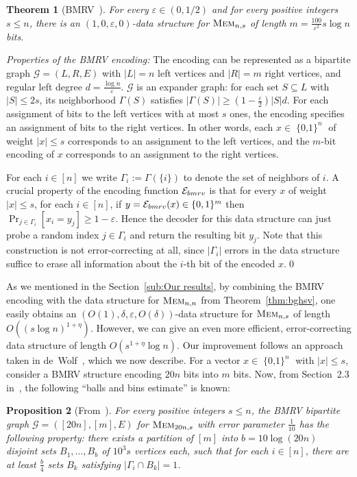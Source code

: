 \documentclass[11pt,english]{article}
\newtheorem{theorem}{Theorem}
\newtheorem{prop}[theorem]{Proposition}
\theoremstyle{definition}
\theoremstyle{remark}
\newcommand{\eps}{\varepsilon}
\newcommand{\E}{{\cal E}}
\newcommand{\cube}{\operatorname{\{0, 1\}}}
\newcommand{\mem}{\mbox{\textsc{Mem}}}
\begin{document}
\begin{theorem}[BMRV~\cite{bmrv:bitvectorsj}]\label{thm:bmrv}
For every $\eps\in(0,1/2)$ and for every positive integers $s\leq n$,
there is an $(1,0,\eps,0)$-data structure for $\mem_{n,s}$ of length
$m=\frac{100}{\eps^{2}}s\log n$ bits. \end{theorem}

\emph{Properties of the BMRV encoding:} The encoding can be represented
as a bipartite graph $\mathcal{G}=(L,R,E)$ with $|L|=n$ left vertices
and $|R|=m$ right vertices, and regular left degree $d=\frac{\log n}{\eps}$.
$\mathcal{G}$ is an expander graph: for each set $S\subseteq L$ with
$|S|\leq2s$, its neighborhood $\Gamma(S)$ satisfies $|\Gamma(S)|\geq\left(1-\frac{\eps}{2}\right)|S|d$.
For each assignment of bits to the left vertices with at most $s$
ones, the encoding specifies an assignment of bits to the right vertices.
In other words, each $x\in\cube^{n}$ of weight $|x|\leq s$ corresponds
to an assignment to the left vertices, and the $m$-bit encoding of
$x$ corresponds to an assignment to the right vertices.

For each $i\in[n]$ we write $\Gamma_{i}:=\Gamma(\{i\})$ to denote
the set of neighbors of $i$. A crucial property of the encoding function
$\E_{bmrv}$ is that for every $x$ of weight $|x|\leq s$, for each
$i\in[n]$, if $y=\E_{bmrv}(x)\in\{0,1\}^{m}$ then $\Pr_{j\in\Gamma_{i}}[x_{i}=y_{j}]\geq1-\eps$.
Hence the decoder for this data structure can just probe a random
index $j\in\Gamma_{i}$ and return the resulting bit $y_{j}$. Note
that this construction is not error-correcting at all, since $|\Gamma_{i}|$
errors in the data structure suffice to erase all information about
the $i$-th bit of the encoded $x$.\qed

\medskip

As we mentioned in the Section~\ref{sub:Our results}, by combining
the BMRV encoding with the data structure for $\mem_{n,n}$ from Theorem~\ref{thm:bghsv},
one easily obtains an $(O(1),\delta,\eps,O(\delta))$-data structure 
for $\mem_{n,s}$ of length $O((s\log n)^{1+\eta})$.
However, we can give an even more efficient, error-correcting data
structure of length $O(s^{1+\eta}\log n)$. Our improvement follows 
an approach taken in de~Wolf~\cite{wolf:ecdata}, which
we now describe. For a vector $x\in\cube^{n}$ with $|x|\leq s$,
consider a BMRV structure encoding $20n$ bits into $m$ bits. Now,
from Section~2.3 in~\cite{wolf:ecdata}, the following ``balls
and bins estimate'' is known:

\begin{prop}[From~\cite{wolf:ecdata}]\label{prop:balls vs bins}
For every positive integers $s\leq n$, the BMRV bipartite graph $\mathcal{G}=([20n],[m],E)$
for $\mem_{20n,s}$ with error parameter $\frac{1}{10}$ has the following
property: there exists a partition of $[m]$ into $b=10\log(20n)$
disjoint sets $B_{1},\ldots,B_{b}$ of $10^{3}s$ vertices each, such
that for each $i\in[n]$, there are at least $\frac{b}{4}$ sets $B_{k}$
satisfying $|\Gamma_{i}\cap B_{k}|=1$. \end{prop}
\end{document}
